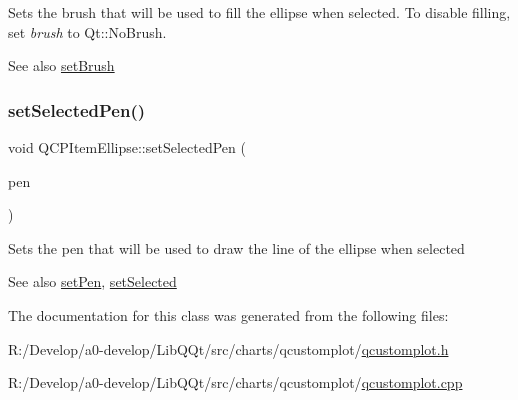 Sets the brush that will be used to fill the ellipse when selected. To disable filling, set {\itshape brush} to Qt\+::\+No\+Brush.

\begin{DoxySeeAlso}{See also}
\mbox{\hyperlink{class_q_c_p_item_ellipse_a49fc74e6965834e873d027d026def798}{set\+Brush}} 
\end{DoxySeeAlso}
\mbox{\label{class_q_c_p_item_ellipse_a6c542fba1dc918041c583f58a50dde99}} 
\subsubsection{\texorpdfstring{set\+Selected\+Pen()}{setSelectedPen()}}
{\footnotesize\ttfamily void Q\+C\+P\+Item\+Ellipse\+::set\+Selected\+Pen (\begin{DoxyParamCaption}\item[{const Q\+Pen \&}]{pen }\end{DoxyParamCaption})}

Sets the pen that will be used to draw the line of the ellipse when selected

\begin{DoxySeeAlso}{See also}
\mbox{\hyperlink{class_q_c_p_item_ellipse_adb81a663ed2420fcfa011e49f678d1a6}{set\+Pen}}, \mbox{\hyperlink{class_q_c_p_abstract_item_a203de94ad586cc44d16c9565f49d3378}{set\+Selected}} 
\end{DoxySeeAlso}


The documentation for this class was generated from the following files\+:\begin{DoxyCompactItemize}
\item 
R\+:/\+Develop/a0-\/develop/\+Lib\+Q\+Qt/src/charts/qcustomplot/\mbox{\hyperlink{qcustomplot_8h}{qcustomplot.\+h}}\item 
R\+:/\+Develop/a0-\/develop/\+Lib\+Q\+Qt/src/charts/qcustomplot/\mbox{\hyperlink{qcustomplot_8cpp}{qcustomplot.\+cpp}}\end{DoxyCompactItemize}
